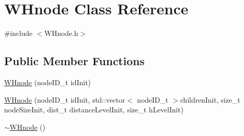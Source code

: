 \hypertarget{classWHnode}{\section{\-W\-Hnode \-Class \-Reference}
\label{classWHnode}
}


{\ttfamily \#include $<$\-W\-Hnode.\-h$>$}

\subsection*{\-Public \-Member \-Functions}
\begin{DoxyCompactItemize}
\item 
\hyperlink{classWHnode_a2552b370714ade234e0735baad81515d}{\-W\-Hnode} (node\-I\-D\-\_\-t id\-Init)
\item 
\hyperlink{classWHnode_abde4e0469a4d22b94793c5041db50c78}{\-W\-Hnode} (node\-I\-D\-\_\-t id\-Init, std\-::vector$<$ node\-I\-D\-\_\-t $>$children\-Init, size\-\_\-t node\-Size\-Init, dist\-\_\-t distance\-Level\-Init, size\-\_\-t h\-Level\-Init)
\item 
\hypertarget{classWHnode_abc37e5644b8b48ab47898478d5fec6da}{\hyperlink{classWHnode_abc37e5644b8b48ab47898478d5fec6da}{$\sim$\-W\-Hnode} ()}\label{classWHnode_abc37e5644b8b48ab47898478d5fec6da}


\end{DoxyCompactItemize}
